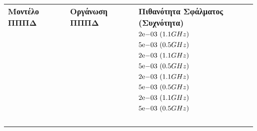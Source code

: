 \begin{table}[t]
    \centering
    \begin{tabularx}{\textwidth}{!{\vrule width 4\arrayrulewidth} >{\centering\arraybackslash}X | >{\centering\arraybackslash}X | >{\centering\arraybackslash}X !{\vrule width 4\arrayrulewidth}}
        \Xhline{4\arrayrulewidth}
        \textbf{Μοντέλο ΠΠΠΔ}   & \textbf{Οργάνωση ΠΠΠΔ}                 & \textbf{Πιθανότητα Σφάλματος (Συχνότητα)} \\
        \Xhline{4\arrayrulewidth}
        
         &  & {$2\mathrm{e}{-03}\ (1.1GHz)$} \\ 
                                &                                        & {$5\mathrm{e}{-03}\ (0.5GHz)$} \\ 
                                &  & {$2\mathrm{e}{-03}\ (1.1GHz)$} \\ 
                                &                                        & {$5\mathrm{e}{-03}\ (0.5GHz)$} \\
        \hline
        
         &  & {$2\mathrm{e}{-03}\ (1.1GHz)$} \\ 
                                                                 &                                        & {$5\mathrm{e}{-03}\ (0.5GHz)$} \\ 
                                                                 &  & {$2\mathrm{e}{-03}\ (1.1GHz)$} \\ 
                                                                 &                                        & {$5\mathrm{e}{-03}\ (0.5GHz)$} \\
        \hline
        
         &  &  \\
                                                                  &                                        &                          \\ 
                                                                  &                                        &  \\
                                                                  &                                        &                          \\
        \hline
        

\end{tabularx}
\end{table}
